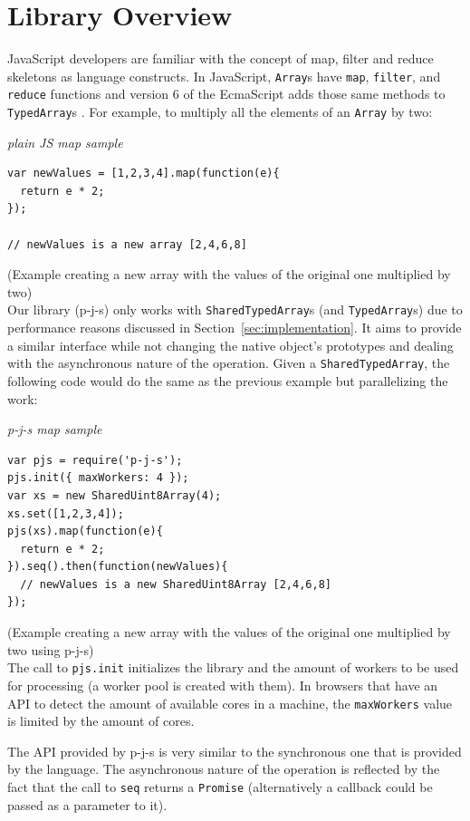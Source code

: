 \documentclass[runningheads,a4paper]{llncs}
\begin{document}
\section{Library Overview}\label{sec:overview}
JavaScript developers are familiar with the concept of map, filter and reduce skeletons as language constructs. In JavaScript, \verb+Array+s have \verb+map+, \verb+filter+, and \verb+reduce+ functions and version 6 of the EcmaScript adds those same methods to \verb+TypedArray+s \cite{es6-ta}. For example, to multiply all the elements of an \verb+Array+ by two:
\medskip

\noindent
{\it plain JS map sample}
\begin{verbatim}
var newValues = [1,2,3,4].map(function(e){
  return e * 2;
});

// newValues is a new array [2,4,6,8]
\end{verbatim}
%
\noindent
{\small (Example creating a new array with the values of the original one multiplied by two)}\\

Our library (p-j-s) only works with \verb+SharedTypedArray+s (and \verb+TypedArray+s) due to performance reasons discussed in Section~\ref{sec:implementation}. It aims to provide a similar interface while not changing the native object's prototypes and dealing with the asynchronous nature of the operation. Given a \verb+SharedTypedArray+, the following code would do the same as the previous example but parallelizing the work:
\medskip

\noindent
{\it p-j-s map sample}
\begin{verbatim}
var pjs = require('p-j-s');
pjs.init({ maxWorkers: 4 });
var xs = new SharedUint8Array(4);
xs.set([1,2,3,4]);
pjs(xs).map(function(e){
  return e * 2;
}).seq().then(function(newValues){
  // newValues is a new SharedUint8Array [2,4,6,8]
});
\end{verbatim}
%
\noindent
{\small (Example creating a new array with the values of the original one multiplied by two using p-j-s)}\\

The call to \verb+pjs.init+ initializes the library and the amount of workers to be used for processing (a worker pool is created with them). In browsers that have an API to detect the amount of available cores in a machine, the \verb+maxWorkers+ value is limited by the amount of cores.

The API provided by p-j-s \cite{pjs-api} is very similar to the synchronous one that is provided by the language. The asynchronous nature of the operation is reflected by the fact that the call to \verb+seq+ returns a \verb+Promise+ (alternatively a callback could be passed as a parameter to it).
\end{document}
